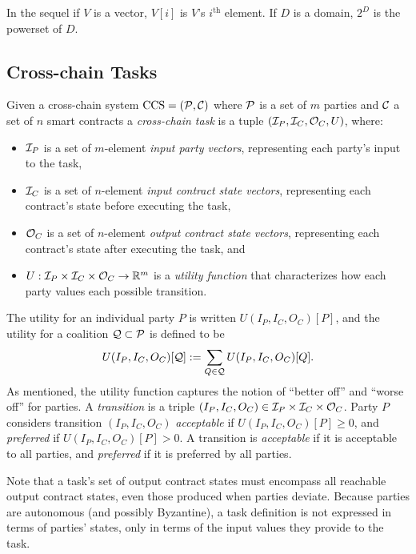  In the sequel if $V$ is a vector, $V[i]$ is $V$'s $i^\text{th}$ element.
If $D$ is a domain, $2^D$ is the powerset of $D$.

\subsection{Cross-chain Tasks}
 
 Given a cross-chain system $\text{CCS}=({\mathcal P},{\mathcal C})$ where ${\mathcal P}$ is a set of $m$ parties  and ${\mathcal C}$ a set of $n$ smart contracts
 a \emph{cross-chain task} is a tuple $({\mathcal I}_P,{\mathcal I}_C,{\mathcal O}_C, U)$, where:
 \begin{itemize}
 \item 
   ${\mathcal I}_P$ is a set of $m$-element \emph{input party vectors},
   representing each party's input to the task,
 \item
   ${\mathcal I}_C$ is a set of $n$-element \emph{input contract state vectors},
   representing each contract's state before executing the task,
 \item
   ${\mathcal O}_C$ is a set of $n$-element \emph{output contract state vectors},
   representing each contract's state after executing the task, and
 \item
   $U:  {\mathcal I}_P \times {\mathcal I}_C \times {\mathcal O}_C \to \mathbb{R}^m$ is a \emph{utility function}
   that characterizes how each party values each possible transition.
 \end{itemize}
 The utility for an individual party $P$ is written $U(I_P,I_C,O_C)[P]$,
 and the utility for a coalition ${\mathcal Q} \subset {\mathcal P}$ is defined to be
 \begin{equation*}
   U(I_P,I_C,O_C)[{\mathcal Q}] := \sum_{Q \in {\mathcal Q}} U(I_P,I_C,O_C)[Q].
 \end{equation*}
As mentioned,
the utility function captures the notion of ``better off'' and ``worse off'' for parties.
A \emph{transition} is a triple $(I_P,I_C,O_C) \in {\mathcal I}_P \times {\mathcal I}_C \times {\mathcal O}_C$.
Party $P$ considers transition $(I_P,I_C,O_C)$ \emph{acceptable}
if $U(I_P,I_C,O_C)[P] \geq 0$,
and \emph{preferred} if $U(I_P,I_C,O_C)[P] > 0$.
A transition is \emph{acceptable} if it is acceptable to all parties,
and \emph{preferred} if it is preferred by all parties.

Note that a task's set of output contract states must encompass all reachable output contract states,
even those produced when parties deviate.
Because parties are autonomous (and possibly Byzantine),
a task definition is not expressed in terms of parties' states, 
only in terms of the input values they provide to the task.

